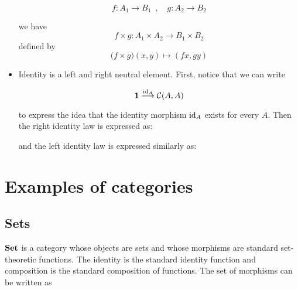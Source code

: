 \begin{definition}
\begin{itemize}
\begin{framed}
      \[f : A_1 \rightarrow B_1
        \enspace,\quad
        g : A_2 \rightarrow B_2\]

      we have
      \[f \times g : A_1 \times A_2 \rightarrow B_1 \times B_2\]
      defined by
      \[\big(f \times g\big)(x, y) \mapsto (f x, g y) \]
  \end{framed}

  \item Identity is a left and right neutral element. First, notice that we
    can write

    \[\mathbf 1 \overset{\mathrm{id}_{ A }}{\longrightarrow} \mathcal C(A, A)\]

    to express the idea that the identity morphism $\mathrm{id}_{ A }$ exists for every
    $A$.  Then the right identity law is expressed as:

    \begin{center}
  \end{center}

    and the left identity law is expressed similarly as:

    \begin{center}
  \end{center}
\end{itemize}

\end{definition}

\section{Examples of categories}

\subsection{Sets}

$\mathbf {Set}$ is a category whose objects are sets and whose morphisms are standard
set-theoretic functions. The identity is the standard identity function and
composition is the standard composition of functions. The set of morphisms can
be written as

